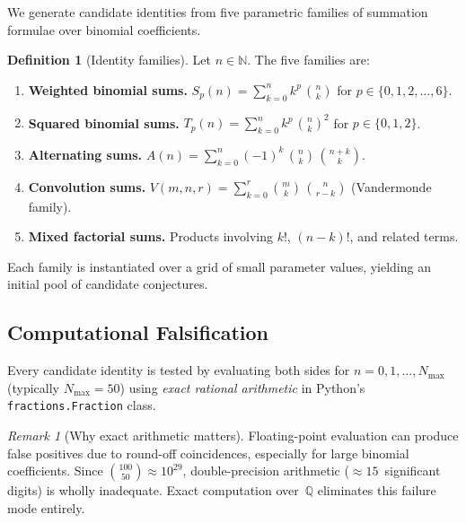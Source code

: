\documentclass[11pt,a4paper]{article}
\theoremstyle{definition}
\newtheorem{definition}[theorem]{Definition}
\theoremstyle{remark}
\newtheorem{remark}[theorem]{Remark}
\newcommand{\N}{\mathbb{N}}
\newcommand{\Q}{\mathbb{Q}}
\begin{document}
We generate candidate identities from five parametric families of
summation formulae over binomial coefficients.

\begin{definition}[Identity families]\label{def:families}
Let $n\in\N$.  The five families are:
\begin{enumerate}
  \item \textbf{Weighted binomial sums.}
        $\displaystyle S_p(n) = \sum_{k=0}^{n} k^p \,\binom{n}{k}$
        for $p\in\{0,1,2,\dots,6\}$.

  \item \textbf{Squared binomial sums.}
        $\displaystyle T_p(n) = \sum_{k=0}^{n} k^p \,\binom{n}{k}^2$
        for $p\in\{0,1,2\}$.

  \item \textbf{Alternating sums.}
        $\displaystyle A(n) = \sum_{k=0}^{n} (-1)^k\,\binom{n}{k}\,\binom{n+k}{k}$.

  \item \textbf{Convolution sums.}
        $\displaystyle V(m,n,r) = \sum_{k=0}^{r} \binom{m}{k}\,\binom{n}{r-k}$
        (Vandermonde family).

  \item \textbf{Mixed factorial sums.}
        Products involving $k!$, $(n-k)!$, and related terms.
\end{enumerate}
\end{definition}

Each family is instantiated over a grid of small parameter values,
yielding an initial pool of candidate conjectures.

\subsection{Computational Falsification}\label{sec:falsify}

Every candidate identity is tested by evaluating both sides
for $n=0,1,\dots,N_{\max}$ (typically $N_{\max}=50$) using
\emph{exact rational arithmetic} in Python's \texttt{fractions.Fraction}
class.

\begin{remark}[Why exact arithmetic matters]
Floating-point evaluation can produce false positives due to
round-off coincidences, especially for large binomial coefficients.
Since $\binom{100}{50}\approx 10^{29}$, double-precision arithmetic
($\approx 15$~significant digits) is wholly inadequate.
Exact computation over~$\Q$ eliminates this failure mode entirely.
\end{remark}
\end{document}
